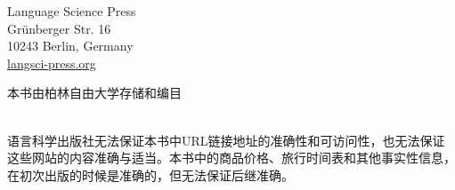 {\bigskip

Language Science Press\\
Grünberger Str. 16\\
10243 Berlin, Germany\\
\href{http://langsci-press.org}{langsci-press.org}

\vfill

本书由柏林自由大学存储和编目 \\[3ex]

\\[3ex]

\vfill

\noindent
语言科学出版社无法保证本书中URL链接地址的准确性和可访问性，也无法保证这些网站的内容准确与适当。本书中的商品价格、旅行时间表和其他事实性信息，在初次出版的时候是准确的，但无法保证后继准确。
}


\makeatother



\newcommand{\mytrans}[1]{\trans\quotetrans{#1}}

\newcommand{\quotetrans}[1]{‘#1’}







